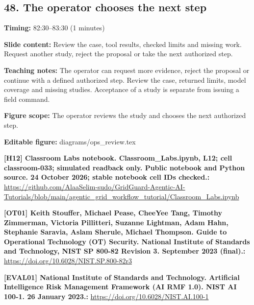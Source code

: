 \documentclass[10pt,letterpaper]{article}
\begin{document}
\subsection*{48. The operator chooses the next step}
\textbf{Timing:} 82:30--83:30 (1 minutes)\par
\textbf{Slide content:} Review the case, tool results, checked limits and missing work.
Request another study, reject the proposal or take the next authorized step.\par
\textbf{Teaching notes:} The operator can request more evidence, reject the proposal or continue with a defined authorized step. Review the case, returned limits, model coverage and missing studies. Acceptance of a study is separate from issuing a field command.\par
\textbf{Figure scope:} The operator reviews the study and chooses the next authorized step.\par
\textbf{Editable figure:} diagrams/ops\_review.tex\par
\textbf{[H12] Classroom Labs notebook. Classroom\_Labs.ipynb, L12; cell classroom-033; simulated readback only. Public notebook and Python source. 24 October 2026; stable notebook cell IDs checked.:} \href{https://github.com/AlaaSelim-sudo/GridGuard-Agentic-AI-Tutorials/blob/main/agentic_grid_workflow_tutorial/Classroom_Labs.ipynb}{\small\ttfamily https:/\allowbreak{}/\allowbreak{}github.\allowbreak{}com/\allowbreak{}AlaaSelim-\allowbreak{}sudo/\allowbreak{}GridGuard-\allowbreak{}Agentic-\allowbreak{}AI-\allowbreak{}Tutorials/\allowbreak{}blob/\allowbreak{}main/\allowbreak{}agentic\_\allowbreak{}grid\_\allowbreak{}workflow\_\allowbreak{}tutorial/\allowbreak{}Classroom\_\allowbreak{}Labs.\allowbreak{}ipynb}\par
\textbf{[OT01] Keith Stouffer, Michael Pease, CheeYee Tang, Timothy Zimmerman, Victoria Pillitteri, Suzanne Lightman, Adam Hahn, Stephanie Saravia, Aslam Sherule, Michael Thompson. Guide to Operational Technology (OT) Security. National Institute of Standards and Technology, NIST SP 800-82 Revision 3. September 2023 (final).:} \href{https://doi.org/10.6028/NIST.SP.800-82r3}{\small\ttfamily https:/\allowbreak{}/\allowbreak{}doi.\allowbreak{}org/\allowbreak{}10.\allowbreak{}6028/\allowbreak{}NIST.\allowbreak{}SP.\allowbreak{}800-\allowbreak{}82r3}\par
\textbf{[EVAL01] National Institute of Standards and Technology. Artificial Intelligence Risk Management Framework (AI RMF 1.0). NIST AI 100-1. 26 January 2023.:} \href{https://doi.org/10.6028/NIST.AI.100-1}{\small\ttfamily https:/\allowbreak{}/\allowbreak{}doi.\allowbreak{}org/\allowbreak{}10.\allowbreak{}6028/\allowbreak{}NIST.\allowbreak{}AI.\allowbreak{}100-\allowbreak{}1}\par
\par\medskip
\end{document}
